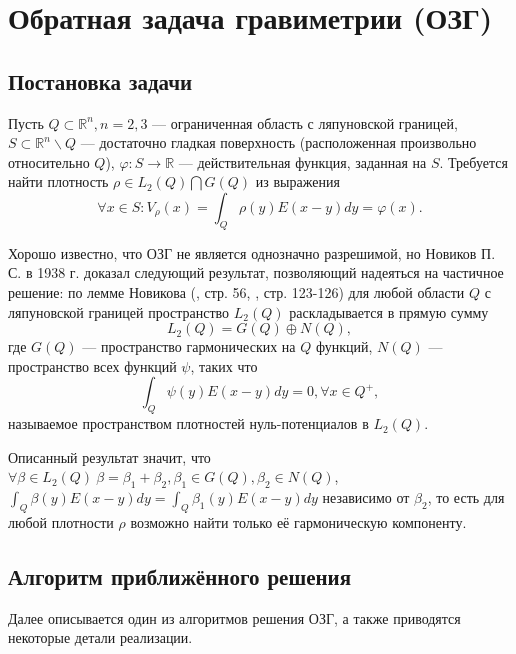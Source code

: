\documentclass[a4paper]{article}
\newcommand{\V}[1]{\int_Q #1(y) E(x-y) dy}
\newcommand{\R}[1]{\mathbb{R}^#1}
\begin{document}
\section{Обратная задача гравиметрии (ОЗГ)}
\subsection{Постановка задачи}
Пусть $Q\subset \R{n}, n=2,3$ --- ограниченная область с ляпуновской границей,
$S \subset \R{n}\backslash Q$ --- достаточно гладкая поверхность (расположенная произвольно относительно $Q$), $\varphi: S \rightarrow \mathbb{R}$ --- действительная функция, заданная на $S$.
Требуется найти плотность $\rho \in L_2(Q) \bigcap G(Q)$ из выражения
\begin{equation}
    \forall x \in S: V_\rho(x)= \V{\rho}= \varphi(x).
\end{equation}

Хорошо известно, что ОЗГ не является однозначно разрешимой, но Новиков П. С. в 1938 г. доказал следующий результат, позволяющий надеяться на частичное решение:
по лемме Новикова (\cite{lezh}, стр. 56, \cite{nov}, стр. 123-126) для любой области $Q$ с ляпуновской границей пространство $L_2(Q)$ раскладывается в прямую сумму 
\begin{equation}
    L_2(Q)= G(Q) \oplus N(Q),
\end{equation}
где $G(Q)$ --- пространство гармонических на $Q$ функций, $N(Q)$ --- пространство всех функций $\psi$, таких что
\begin{equation}
    \V{\psi}=0, \forall x\in Q^+,
\end{equation}
называемое пространством плотностей нуль-потенциалов в $L_2(Q)$.

Описанный результат значит, что $\forall \beta \in L_2(Q) \ \beta = \beta_1 + \beta_2, \beta_1 \in G(Q), \beta_2 \in N(Q)$, $\V{\beta}=\V{\beta_1}$ независимо от $\beta_2$, то есть для любой плотности $\rho$ возможно найти только её гармоническую компоненту.   


\subsection{Алгоритм приближённого решения}

Далее описывается один из алгоритмов решения ОЗГ, а также приводятся некоторые детали реализации.
\end{document}
